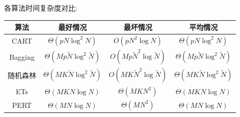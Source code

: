 \documentclass[a4paper,UTF8]{article}
\begin{document}
各算法时间复杂度对比: 
\begin{table}[!htbp]
  \centering
  \begin{tabular}{|c|c|c|c|}
    \hline
    算法 & 最好情况 & 最坏情况 & 平均情况\\
    \hline
    CART&$\Theta(pN\log^2N)$&$O(pN^2\log N)$&$\Theta(pN\log^2N)$\\
    \hline
    Bagging&$\Theta(Mp\tilde{N}\log^2\tilde{N})$&$O(Mp\tilde{N}^2\log\tilde{N})$&$\Theta(Mp\tilde{N}\log^2\tilde{N})$\\
    \hline
    随机森林&$\Theta(MK\tilde{N}\log^2\tilde{N})$&$O(MK\tilde{N}^2\log\tilde{N})$&$\Theta(MK\tilde{N}\log^2\tilde{N})$\\
    \hline
    ETs&$\Theta(MKN\log N)$&$\Theta(MKN^2)$&$\Theta(MKN\log N)$\\
    \hline
    PERT&$\Theta(MN\log N)$&$\Theta(MN^2)$&$\Theta(MN\log N)$\\
    \hline
  \end{tabular}
\end{table}
\end{document}
